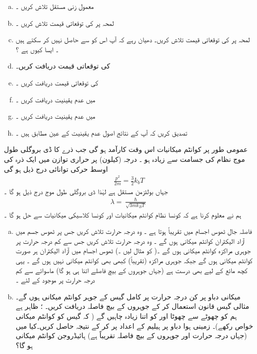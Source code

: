 \begin{enumerate}[a.]
\item
معمول زنی مستقل   تلاش کریں ۔ 
\item
 لمحہ    پر     کی توقعاتی قیمت تلاش کریں ۔
\item
 لمحہ   پر    کی توقعاتی قیمت تلاش کریں۔  دھیان رہے  کہ  آپ اس کو      سے حاصل نہیں کر سکتے ہیں ۔ ایسا کیوں ہے ؟
\item
{} کی توقعاتی قیمت دریافت کریں۔ 
\item
{}  کی توقعاتی قیمت دریافت کریں ۔  
\item
{}  میں   عدم یقینیت  دریافت کریں ۔ 
\item
{} میں عدم یقینیت دریافت کریں ۔
\item
 تصدیق کریں کہ آپ کے نتائج اصول عدم یقینیت  کے عین مطابق ہیں ۔
\end{enumerate}
عمومی طور پر کوانٹم میکانیات اس وقت کارآمد   ہو گی  جب   ذرے  کا  ڈی بروگلی طول موج   نظام کی  جسامت  سے زیادہ ہو ۔ درجہ     (کیلون)   پر حراری توازن میں ایک   ذرہ  کی اوسط حرکی توانائی درج ذیل ہو گی 
\begin{align*}
\frac{ p^2 }{ 2 m } =  \frac{ 3 }{ 2 } k_b T
\end{align*}
جہاں    بولٹزمن مستقل ہے   لہٰذا  ڈی بروگلی طول  موج درج ذیل ہو گا ۔
\begin{align*}
\lambda = \frac{ \hslash }{ \sqrt{ 3 m k_B T } }
\end{align*}
ہم نے معلوم کرنا ہے کہ کونسا نظام کوانٹم میکانیات  اور کونسا  کلاسیکی میکانیات  سے حل ہو گا  ۔ 
\begin{enumerate}[a.]
\item
{}\quad
  فاصلہ جال  ٹھوس اجسام میں   تقریباً  ہوتا ہے ۔ وہ درجہ حرارت تلاش کریں  جس پر  ٹھوس جسم میں  آزاد الیکٹران  کوانٹم میکانی  ہوں گے ۔ وہ درجہ حرارت تلاش کریں جس سے کم درجہ حرارت پر  جوہری مراکزہ  کوانٹم میکانی  ہوں گے ۔( کو   مثال  لیں ۔) \quad 
ٹھوس اجسام میں آزاد  الیکٹران ہر صورت کوانٹم میکانی ہوں گے  جبکہ جوہری  مراکزہ (تقریباً) کبھی بھی کوانٹم میکانی نہیں ہوں گے ۔ یہی  کچھ  مائع  کے لیے بھی درست ہے (جہاں جوہروں  کے بیچ فاصلے اتنا ہی ہو گا)   ماسوائے   سے کم درجہ حرارت پر موجود  کے  لئے ۔
\item
{} میکانی دباو  پر کن  درجہ حرارت پر کامل گیس کے جوہر کوانٹم میکانی ہوں گے۔     \quad
مثالی گیس  قانون   استعمال کر کے  جوہروں کے بیچ فاصلہ دریافت کریں۔ \quad
{}  ؛  ظاہر ہے  ہم  کو چھوٹے سے چھوٹا  اور  کو اتنا  زیادہ چاہیں گے (  کہ  گیس کو کوانٹم میکانی خواص رکھے)۔  زمینی ہوا  دباو پر ہیلیم  کے اعداد پر کر کے نتیجہ حاصل کریں۔کیا    میں (جہاں درجہ حرارت  اور جوہروں کے بیچ فاصلہ تقریباً    ہے)  ہائیڈروجن  کوانٹم میکانی ہو گا؟  
\end{enumerate}
